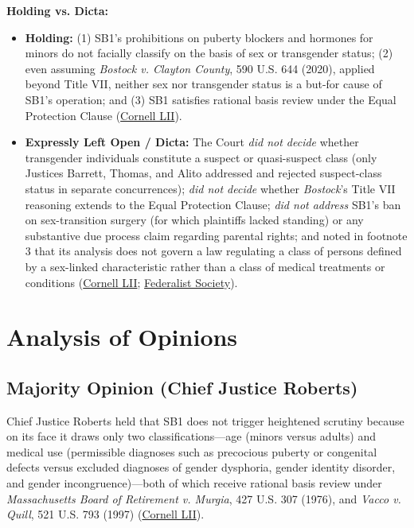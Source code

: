 \documentclass[12pt]{article}
\begin{document}
\textbf{Holding vs. Dicta:}
\begin{itemize}
\item \textbf{Holding:} (1) SB1's prohibitions on puberty blockers and hormones for minors do not facially classify on the basis of sex or transgender status; (2) even assuming \textit{Bostock v. Clayton County}, 590 U.S. 644 (2020), applied beyond Title VII, neither sex nor transgender status is a but-for cause of SB1's operation; and (3) SB1 satisfies rational basis review under the Equal Protection Clause (\href{https://www.law.cornell.edu/supremecourt/text/23-477}{Cornell LII}).
\item \textbf{Expressly Left Open / Dicta:} The Court \textit{did not decide} whether transgender individuals constitute a suspect or quasi-suspect class (only Justices Barrett, Thomas, and Alito addressed and rejected suspect-class status in separate concurrences); \textit{did not decide} whether \textit{Bostock}'s Title VII reasoning extends to the Equal Protection Clause; \textit{did not address} SB1's ban on sex-transition surgery (for which plaintiffs lacked standing) or any substantive due process claim regarding parental rights; and noted in footnote 3 that its analysis does not govern a law regulating a class of persons defined by a sex-linked characteristic rather than a class of medical treatments or conditions (\href{https://www.law.cornell.edu/supremecourt/text/23-477}{Cornell LII}; \href{https://fedsoc.org/commentary/fedsoc-blog/supreme-court-upholds-tennessee-s-ban-on-gender-affirming-care-for-minors-in-united-states-v-skrmetti}{Federalist Society}).
\end{itemize}

\section{Analysis of Opinions}

\subsection{Majority Opinion (Chief Justice Roberts)}

Chief Justice Roberts held that SB1 does not trigger heightened scrutiny because on its face it draws only two classifications---age (minors versus adults) and medical use (permissible diagnoses such as precocious puberty or congenital defects versus excluded diagnoses of gender dysphoria, gender identity disorder, and gender incongruence)---both of which receive rational basis review under \textit{Massachusetts Board of Retirement v. Murgia}, 427 U.S. 307 (1976), and \textit{Vacco v. Quill}, 521 U.S. 793 (1997) (\href{https://www.law.cornell.edu/supremecourt/text/23-477}{Cornell LII}).
\end{document}

